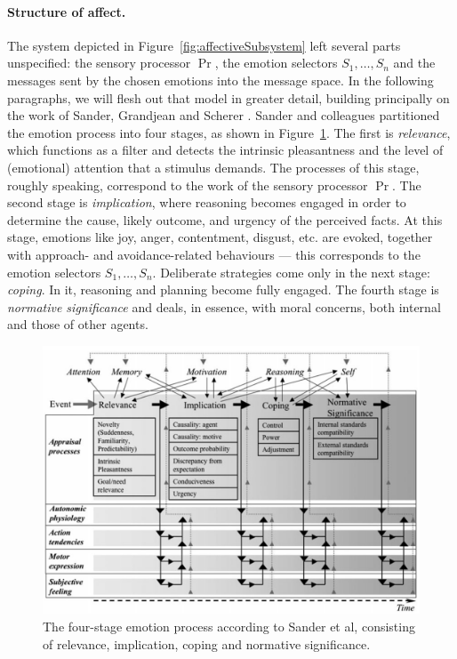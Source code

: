 \paragraph{Structure of affect.} The system depicted in Figure~\ref{fig:affectiveSubsystem} left several parts unspecified: the sensory processor $\Pr$, the emotion selectors $S_1,\dots,S_n$ and the messages sent by the chosen emotions into the message space. In the following paragraphs, we will flesh out that model in greater detail, building principally on the work of Sander, Grandjean and Scherer \cite{DBLP:journals/nn/SanderGS05}. Sander and colleagues partitioned the emotion process into four stages, as shown in Figure~\ref{fig:sanderSystem}. The first is {\em relevance}, which functions as a filter and detects the intrinsic pleasantness and the level of (emotional) attention that a stimulus demands. The processes of this stage, roughly speaking, correspond to the work of the sensory processor $\Pr$. The second stage is {\em implication}, where reasoning becomes engaged in order to determine the cause, likely outcome, and urgency of the perceived facts. At this stage, emotions like joy, anger, contentment, disgust, etc. are evoked, together with approach- and avoidance-related behaviours --- this corresponds to the emotion selectors $S_1,\dots,S_n$. Deliberate strategies come only in the next stage: {\em coping}. In it, reasoning and planning become fully engaged. The fourth stage is {\em normative significance} and deals, in essence, with moral concerns, both internal and those of other agents.

\begin{figure}[t]
	\centering
	\includegraphics[width=350pt]{Figs/sanderSystem.png}
	\caption{The four-stage emotion process according to Sander et al, consisting of relevance, implication, coping and normative significance.}
	\label{fig:sanderSystem}
\end{figure}

